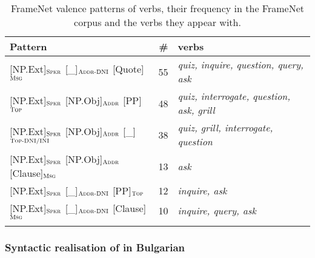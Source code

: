 \documentclass[output=paper,colorlinks,citecolor=brown]{langscibook}
\begin{document}
\begin{table}
    \centering\footnotesize
    \begin{tabularx}{\textwidth}{ lrQ }
\lsptoprule
         Pattern  & \#  & verbs \\
\midrule
{[NP.Ext]}$_{\text{\textsc{Spkr}}}$ {[\_]}$_{\text{\textsc{Addr-DNI}}}$ {[Quote]}$_{\text{\textsc{Msg}}}$  & 55 & \textit{quiz, inquire, question, query, ask}\\
{[NP.Ext]}$_{\text{\textsc{Spkr}}}$ {[NP.Obj]}$_{\text{\textsc{Addr}}}$ {[PP]}$_{\text{\textsc{Top}}}$  & 48 & \textit{quiz, interrogate, question, ask, grill}\\
{[NP.Ext]}$_{\text{\textsc{Spkr}}}$ {[NP.Obj]}$_{\text{\textsc{Addr}}}$ {[\_]}$_{\text{\textsc{Top-DNI/INI}}}$  & 38 & \textit{quiz, grill, interrogate, question}\\
{[NP.Ext]}$_{\text{\textsc{Spkr}}}$ {[NP.Obj]}$_{\text{\textsc{Addr}}}$ {[Clause]}$_{\text{\textsc{Msg}}}$  & 13 & \textit{ask}\\
{[NP.Ext]}$_{\text{\textsc{Spkr}}}$ {[\_]}$_{\text{\textsc{Addr-DNI}}}$ {[PP]}$_{\text{\textsc{Top}}}$  & 12 & \textit{inquire, ask}\\
{[NP.Ext]}$_{\text{\textsc{Spkr}}}$ {[\_]}$_{\text{\textsc{Addr-DNI}}}$ {[Clause]}$_{\text{\textsc{Msg}}}$  & 10 & \textit{inquire, query, ask}\\
\lspbottomrule
    \end{tabularx}
    \caption{FrameNet valence patterns of  verbs, their frequency in the FrameNet corpus and the verbs they appear with.}
    \label{tbl:questioning-valence}
\end{table} 

\subsubsection{Syntactic realisation of  in Bulgarian}
\end{document}
